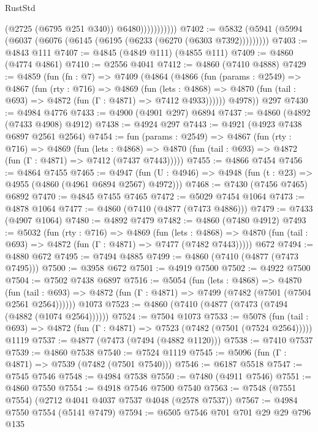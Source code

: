 \begin{lexlean}{RustStd}
\begin{coremodule}
                          (@2725 (@6795 @251 @340))
                          @6480)))))))))))
@7402 := @5832 (@5941 (@5994 (@6037 (@6076 (@6145 (@6195 (@6233 (@6270 (@6303 @7392)))))))))
@7403 := @4843 @111
@7407 := @4845 (@4849 @111) (@4855 @111)
@7409 := @4860 (@4774 @4861)
@7410 := @2556 @4041
@7412 := @4860 (@7410 @4888)
@7429 := @4859
    (fun (fn : @7) =>
    @7409
      (@4864
        (@4866
          (fun (params : @2549) =>
          @4867
            (fun (rty : @716) =>
            @4869
              (fun (lets : @4868) =>
              @4870 (fun (tail : @693) => @4872 (fun (Γ : @4871) => @7412 @4933))))))
        @4978))
    @297
@7430 := @4984 @4776
@7433 := @4900 (@4901 @297) @6894
@7437 := @4860 (@4892 (@7433 @4908) @4912)
@7438 := @4924 @297
@7443 := @4921 (@4923 @7438 @6897 @2561 @2564)
@7454 := fun (params : @2549) =>
  @4867
    (fun (rty : @716) =>
    @4869
      (fun (lets : @4868) =>
      @4870 (fun (tail : @693) => @4872 (fun (Γ : @4871) => @7412 (@7437 @7443)))))
@7455 := @4866 @7454
@7456 := @4864 @7455
@7465 := @4947 (fun (U : @4946) => @4948 (fun (t : @23) => @4955 (@4860 (@4961 @6894 @2567) @4972)))
@7468 := @7430 (@7456 @7465) @6892
@7470 := @4845 @7455 @7465
@7472 := @5029 @7454 @1064
@7473 := @4878 @1064
@7477 := @4860 (@7410 (@4877 (@7473 @4886)))
@7479 := @7433 (@4907 @1064)
@7480 := @4892 @7479
@7482 := @4860 (@7480 @4912)
@7493 := @5032
    (fun (rty : @716) =>
    @4869
      (fun (lets : @4868) =>
      @4870 (fun (tail : @693) => @4872 (fun (Γ : @4871) => @7477 (@7482 @7443)))))
    @672
@7494 := @4880 @672
@7495 := @7494 @4885
@7499 := @4860 (@7410 (@4877 (@7473 @7495)))
@7500 := @3958 @672
@7501 := @4919 @7500
@7502 := @4922 @7500
@7504 := @7502 @7438 @6897
@7516 := @5054
    (fun (lets : @4868) =>
    @4870
      (fun (tail : @693) => @4872 (fun (Γ : @4871) => @7499 (@7482 (@7501 (@7504 @2561 @2564))))))
    @1073
@7523 := @4860 (@7410 (@4877 (@7473 (@7494 (@4882 (@1074 @2564))))))
@7524 := @7504 @1073
@7533 := @5078
    (fun (tail : @693) => @4872 (fun (Γ : @4871) => @7523 (@7482 (@7501 (@7524 @2564)))))
    @1119
@7537 := @4877 (@7473 (@7494 (@4882 @1120)))
@7538 := @7410 @7537
@7539 := @4860 @7538
@7540 := @7524 @1119
@7545 := @5096 (fun (Γ : @4871) => @7539 (@7482 (@7501 @7540)))
@7546 := @6187 @5518
@7547 := @7545 @7546
@7548 := @4984 @7538
@7550 := @7480 (@4911 @7546)
@7551 := @4860 @7550
@7554 := @4918 @7546 @7500 @7540
@7563 := @7548 (@7551 @7554) (@2712 @4041 @4037 @7537 @4048 (@2578 @7537))
@7567 := @4984 @7550 @7554 (@5141 @7479)
@7594 := @6505
    @7546
    @701
    @701
    @29
    @29
    @796
    @135

\end{coremodule}
\end{lexlean}
